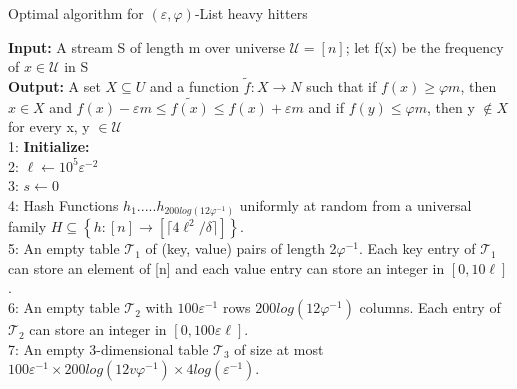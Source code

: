 \documentclass{article}
\begin{document}
\begin{multicols}{2}
{    \begin{algorithm}[H]
    	\caption{Optimal algorithm for $(\varepsilon, \varphi)$-List heavy hitters}
    	\SetAlgoLined
    	\textbf{Input:} A stream S of length m over universe $\mathcal{U}=[n]$; let f(x) be the frequency of $x\in \mathcal{U}$ in S\\
    	\textbf{Output:} A set $X \subseteq U$ and a function $\tilde{f} : X \rightarrow N$ such that if $f(x)\geqslant \varphi m$, then $x \in X$ and 
    	$f(x)- \varepsilon m \leqslant \tilde{f(x)} \leqslant f(x) + \varepsilon m$ and if $f(y) \leqslant \varphi m$, then y  $\notin X $  for every x, y $\in \mathcal{U}$\\
    	
    	1: \textbf{Initialize:}\\
    	2: \hspace{.3cm}$\ell \leftarrow 10^5\varepsilon^{-2}$\\ 
    	3: \hspace*{.3cm}$s \leftarrow 0$\\
    	4: \hspace*{.3cm}Hash Functions $h_{1}.....h_{200log(12 \varphi^{-1})}$ \hspace*{.4cm} uniformly at random from a universal \hspace*{.5cm}family $H \subseteq \left\{h:[n] \rightarrow 
    	[\lceil 4\ell^{2}/\delta \rceil] \right\}.$\\
    	5: \hspace*{.3cm}An empty table $\mathcal{T}_{1}$ of (key, value) pairs of \hspace*{.5cm}length 2$\varphi^{-1}$. Each key entry of $\mathcal{T}_{1}$ can store \hspace*{.5cm}an element of [n] and each value entry can \hspace*{.5cm}  store an integer in $[0,10\ell]$. \\
    	6:\hspace*{.3cm} An empty table $\mathcal{T}_{2}$ with $100\varepsilon^{-1}$ rows \hspace*{.4cm} $200log(12\varphi^{-1})$ columns. Each entry of $\mathcal{T}_{2}$ \hspace*{.4cm} can store an integer in $[0,100\varepsilon\ell]$.\\
    	7:\hspace*{.3cm} An empty 3-dimensional table $\mathcal{T}_{3}$ of size at
    	\hspace*{.4cm} most $100\varepsilon^{-1}\times200log(12v\varphi^{-1})\times4log(\varepsilon^{-1})$.

\end{algorithm}}
\end{multicols}
\end{document}
